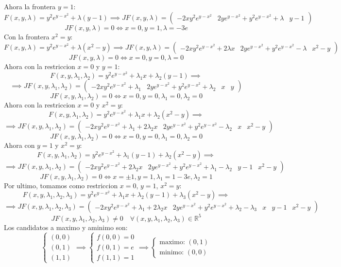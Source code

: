 \documentclass[DIN, pagenumber=false, fontsize=11pt, parskip=half]{scrartcl}
\begin{document}
Ahora la frontera $y = 1$:
\[
F(x, y, \lambda) = y^2e^{y-x^2} + \lambda (y-1)
\implies
JF(x, y, \lambda) =
\begin{pmatrix} -2xy^2e^{y-x^2} & 2ye^{y-x^2} + y^2e^{y-x^2} + \lambda & y - 1 \end{pmatrix}
\]
\[
JF(x, y, \lambda) = 0 \iff x = 0, y = 1, \lambda = -3e
\]
Con la frontera $x^2 = y$:
\[
F(x, y, \lambda) = y^2e^{y-x^2} + \lambda (x^2 - y)
\implies
JF(x, y, \lambda) =
\begin{pmatrix} -2xy^2e^{y-x^2} + 2\lambda x & 2ye^{y-x^2} + y^2e^{y-x^2} - \lambda &
x^2 - y \end{pmatrix}
\]
\[
JF(x, y, \lambda) = 0 \iff x = 0, y = 0, \lambda = 0
\]
Ahora con la restriccion $x=0$ y $y=1$:
\[
F(x, y, \lambda_1, \lambda_2) = y^2e^{y-x^2} + \lambda_1 x + \lambda_2 (y-1) \implies
\]
\[
\implies JF(x, y, \lambda_1, \lambda_2) = 
\begin{pmatrix}
-2xy^2e^{y-x^2} + \lambda_1 & 2ye^{y-x^2} + y^2e^{y-x^2} + \lambda_2 & x & y
\end{pmatrix}
\]
\[
JF(x, y, \lambda_1, \lambda_2) = 0 \iff x=0,y=0,\lambda_1=0,\lambda_2=0
\]
Ahora con la restriccion $x=0$ y $x^2=y$:
\[
F(x, y, \lambda_1, \lambda_2) = y^2e^{y-x^2} + \lambda_1 x + \lambda_2 (x^2 - y) \implies
\]
\[
\implies JF(x, y, \lambda_1, \lambda_2) = 
\begin{pmatrix}
-2xy^2e^{y-x^2} + \lambda_1 + 2\lambda_2x & 2ye^{y-x^2} + y^2e^{y-x^2} - \lambda_2 & x & x^2 - y
\end{pmatrix}
\]
\[
JF(x, y, \lambda_1, \lambda_2) = 0 \iff x=0,y=0,\lambda_1=0,\lambda_2=0
\]
Ahora con $y=1$ y $x^2=y$:
\[
F(x, y, \lambda_1, \lambda_2) = y^2e^{y-x^2} + \lambda_1 (y-1) + \lambda_2 (x^2 - y) \implies
\]
\[
\implies JF(x, y, \lambda_1, \lambda_2) = 
\begin{pmatrix}
-2xy^2e^{y-x^2} + 2\lambda_2x & 2ye^{y-x^2} + y^2e^{y-x^2} +\lambda_1 - \lambda_2 & y-1 & x^2 - y
\end{pmatrix}
\]
\[
JF(x, y, \lambda_1, \lambda_2) = 0 \iff x=\pm 1, y =1, \lambda_1 = 1-3e, \lambda_2=1
\]
Por ultimo, tomamos como restriccion $x=0$, $y=1$, $x^2=y$:
\[
F(x, y, \lambda_1, \lambda_2, \lambda_3) = y^2e^{y-x^2} + \lambda_1 x + \lambda_2 (y-1) +
\lambda_3 (x^2 - y) \implies
\]
\[
\implies JF(x, y, \lambda_1, \lambda_2, \lambda_3) = 
\begin{pmatrix}
-2xy^2e^{y-x^2} + \lambda_1 + 2\lambda_2 x & 2ye^{y-x^2} + y^2e^{y-x^2} + \lambda_2 - \lambda_3
& x & y-1 & x^2 - y
\end{pmatrix}
\]
\[
JF(x, y, \lambda_1, \lambda_2, \lambda_3) \neq 0 \quad
\forall (x, y, \lambda_1, \lambda_2, \lambda_3) \in \mathbb{R}^5
\]
Los candidatos a maximo y aminimo son:
\[
\begin{cases}
(0,0) \\
(0,1) \\
(1, 1)
\end{cases}
\implies
\begin{cases}
f(0, 0) = 0 \\
f(0, 1) = e \\
f(1, 1) = 1
\end{cases}
\implies
\begin{cases}
\text{maximo: } (0, 1) \\
\text{minimo: } (0, 0)
\end{cases}
\]
\end{document}
